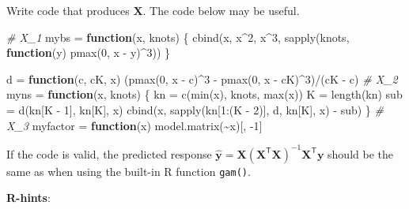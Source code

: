 \documentclass[
]{article}
\newenvironment{Shaded}{\begin{snugshade}}{\end{snugshade}}
\newcommand{\CommentTok}[1]{\textcolor[rgb]{0.56,0.35,0.01}{\textit{#1}}}
\newcommand{\ControlFlowTok}[1]{\textcolor[rgb]{0.13,0.29,0.53}{\textbf{#1}}}
\newcommand{\DecValTok}[1]{\textcolor[rgb]{0.00,0.00,0.81}{#1}}
\newcommand{\FunctionTok}[1]{\textcolor[rgb]{0.00,0.00,0.00}{#1}}
\newcommand{\NormalTok}[1]{#1}
\newcommand{\OtherTok}[1]{\textcolor[rgb]{0.56,0.35,0.01}{#1}}
\newcommand{\SpecialCharTok}[1]{\textcolor[rgb]{0.00,0.00,0.00}{#1}}
\begin{document}
Write code that produces \(\mathbf X\). The code below may be useful.

\begin{Shaded}
\begin{Highlighting}[]
\CommentTok{\# X\_1}
\NormalTok{mybs }\OtherTok{=} \ControlFlowTok{function}\NormalTok{(x, knots) \{}
    \FunctionTok{cbind}\NormalTok{(x, x}\SpecialCharTok{\^{}}\DecValTok{2}\NormalTok{, x}\SpecialCharTok{\^{}}\DecValTok{3}\NormalTok{, }\FunctionTok{sapply}\NormalTok{(knots, }\ControlFlowTok{function}\NormalTok{(y) }\FunctionTok{pmax}\NormalTok{(}\DecValTok{0}\NormalTok{, x }\SpecialCharTok{{-}}\NormalTok{ y)}\SpecialCharTok{\^{}}\DecValTok{3}\NormalTok{))}
\NormalTok{\}}

\NormalTok{d }\OtherTok{=} \ControlFlowTok{function}\NormalTok{(c, cK, x) (}\FunctionTok{pmax}\NormalTok{(}\DecValTok{0}\NormalTok{, x }\SpecialCharTok{{-}}\NormalTok{ c)}\SpecialCharTok{\^{}}\DecValTok{3} \SpecialCharTok{{-}} \FunctionTok{pmax}\NormalTok{(}\DecValTok{0}\NormalTok{, x }\SpecialCharTok{{-}}\NormalTok{ cK)}\SpecialCharTok{\^{}}\DecValTok{3}\NormalTok{)}\SpecialCharTok{/}\NormalTok{(cK }\SpecialCharTok{{-}}\NormalTok{ c)}
\CommentTok{\# X\_2}
\NormalTok{myns }\OtherTok{=} \ControlFlowTok{function}\NormalTok{(x, knots) \{}
\NormalTok{    kn }\OtherTok{=} \FunctionTok{c}\NormalTok{(}\FunctionTok{min}\NormalTok{(x), knots, }\FunctionTok{max}\NormalTok{(x))}
\NormalTok{    K }\OtherTok{=} \FunctionTok{length}\NormalTok{(kn)}
\NormalTok{    sub }\OtherTok{=} \FunctionTok{d}\NormalTok{(kn[K }\SpecialCharTok{{-}} \DecValTok{1}\NormalTok{], kn[K], x)}
    \FunctionTok{cbind}\NormalTok{(x, }\FunctionTok{sapply}\NormalTok{(kn[}\DecValTok{1}\SpecialCharTok{:}\NormalTok{(K }\SpecialCharTok{{-}} \DecValTok{2}\NormalTok{)], d, kn[K], x) }\SpecialCharTok{{-}}\NormalTok{ sub)}
\NormalTok{\}}
\CommentTok{\# X\_3}
\NormalTok{myfactor }\OtherTok{=} \ControlFlowTok{function}\NormalTok{(x) }\FunctionTok{model.matrix}\NormalTok{(}\SpecialCharTok{\textasciitilde{}}\NormalTok{x)[, }\SpecialCharTok{{-}}\DecValTok{1}\NormalTok{]}
\end{Highlighting}
\end{Shaded}

If the code is valid, the predicted response
\(\hat{\mathbf y} = \mathbf X(\mathbf X^\mathsf{T} \mathbf X)^{-1} \mathbf X^\mathsf{T} \mathbf y\)
should be the same as when using the built-in R function \texttt{gam()}.

\textbf{R-hints}:
\end{document}
